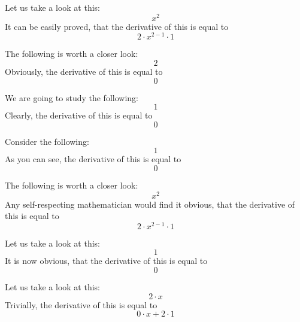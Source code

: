 \documentclass{article}
\begin{document}
Let us take a look at this:
\begin{equation}
x ^{2 } 
\end{equation}
It can be easily proved, that the derivative of this is equal to
\begin{equation}
2 \cdot x ^{2 - 1 } \cdot 1 
\end{equation}

The following is worth a closer look:
\begin{equation}
2 
\end{equation}
Obviously, the derivative of this is equal to
\begin{equation}
0 
\end{equation}

We are going to study the following:
\begin{equation}
1 
\end{equation}
Clearly, the derivative of this is equal to
\begin{equation}
0 
\end{equation}

Consider the following:
\begin{equation}
1 
\end{equation}
As you can see, the derivative of this is equal to
\begin{equation}
0 
\end{equation}

The following is worth a closer look:
\begin{equation}
x ^{2 } 
\end{equation}
Any self-respecting mathematician would find it obvious, that the derivative of this is equal to
\begin{equation}
2 \cdot x ^{2 - 1 } \cdot 1 
\end{equation}

Let us take a look at this:
\begin{equation}
1 
\end{equation}
It is now obvious, that the derivative of this is equal to
\begin{equation}
0 
\end{equation}

Let us take a look at this:
\begin{equation}
2 \cdot x 
\end{equation}
Trivially, the derivative of this is equal to
\begin{equation}
0 \cdot x + 2 \cdot 1 
\end{equation}
\end{document}
